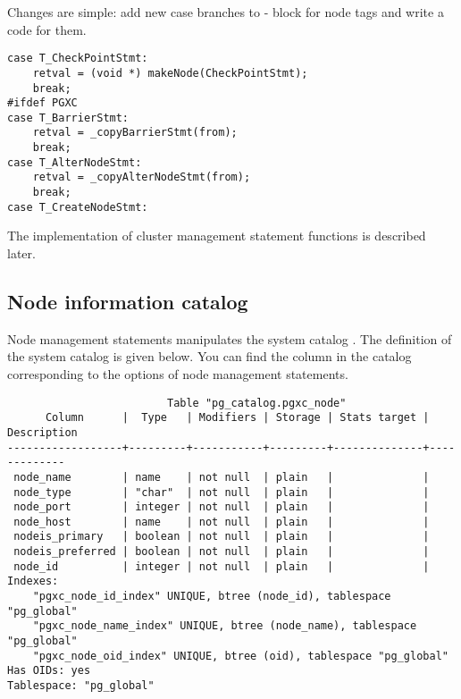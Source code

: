   Changes are simple: add new case branches to - block for node tags and write a code for them.
  
  \begin{lstlisting}
case T_CheckPointStmt:
	retval = (void *) makeNode(CheckPointStmt);
	break;
#ifdef PGXC
case T_BarrierStmt:
	retval = _copyBarrierStmt(from);
	break;
case T_AlterNodeStmt:
	retval = _copyAlterNodeStmt(from);
	break;
case T_CreateNodeStmt:
  \end{lstlisting}
  
  The implementation of cluster management statement functions is described later.



\subsection{Node information catalog}

  Node management statements manipulates the system catalog .
  The definition of the system catalog is given below.
  You can find the column in the catalog corresponding to the options of node management statements.
  
  \begin{lstlisting}
                         Table "pg_catalog.pgxc_node"
      Column      |  Type   | Modifiers | Storage | Stats target | Description 
------------------+---------+-----------+---------+--------------+-------------
 node_name        | name    | not null  | plain   |              | 
 node_type        | "char"  | not null  | plain   |              | 
 node_port        | integer | not null  | plain   |              | 
 node_host        | name    | not null  | plain   |              | 
 nodeis_primary   | boolean | not null  | plain   |              | 
 nodeis_preferred | boolean | not null  | plain   |              | 
 node_id          | integer | not null  | plain   |              | 
Indexes:
    "pgxc_node_id_index" UNIQUE, btree (node_id), tablespace "pg_global"
    "pgxc_node_name_index" UNIQUE, btree (node_name), tablespace "pg_global"
    "pgxc_node_oid_index" UNIQUE, btree (oid), tablespace "pg_global"
Has OIDs: yes
Tablespace: "pg_global"
  \end{lstlisting}
  
